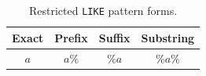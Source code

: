 \begin{table}[t]
\centering
\caption{Restricted \texttt{LIKE} pattern forms.}
\label{tab:like-pattern-types}
\small
\begin{tabular}{@{}cccc@{}}
\toprule
{}Exact & Prefix & Suffix & Substring \\
\midrule
$a$ & $a\texttt{\%}$ & $\texttt{\%}a$ & $\texttt{\%}a\texttt{\%}$ \\
\bottomrule
\end{tabular}
\end{table}
